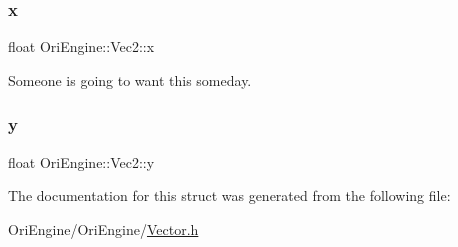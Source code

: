 \subsubsection{\texorpdfstring{x}{x}}
{\footnotesize\ttfamily float Ori\+Engine\+::\+Vec2\+::x}



Someone is going to want this someday. 

\hypertarget{struct_ori_engine_1_1_vec2_a0fb55c74edfbbc37c84004c8cb3a18dc}{}\label{struct_ori_engine_1_1_vec2_a0fb55c74edfbbc37c84004c8cb3a18dc} 
\subsubsection{\texorpdfstring{y}{y}}
{\footnotesize\ttfamily float Ori\+Engine\+::\+Vec2\+::y}



The documentation for this struct was generated from the following file\+:\begin{DoxyCompactItemize}
\item 
Ori\+Engine/\+Ori\+Engine/\hyperlink{_vector_8h}{Vector.\+h}\end{DoxyCompactItemize}
